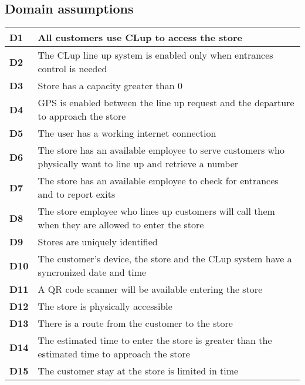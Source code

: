 \subsection{Domain assumptions}

    \begin{center}
        {\renewcommand{\arraystretch}{2}%
        \begin{longtable}{L{2cm}L{12cm}}
            \hline
            \textbf{D1} & All customers use CLup to access the store \\
            \hline
            \textbf{D2} & The CLup line up system is enabled only when entrances control is needed \\
            \hline
            \textbf{D3} & Store has a capacity greater than 0 \\
            \hline
            \textbf{D4} & GPS is enabled between the line up request and the departure to approach the store \\
            \hline
            \textbf{D5} & The user has a working internet connection \\
            \hline
            \textbf{D6} & The store has an available employee to serve customers who physically want to line up and retrieve a number \\
            \hline
            \textbf{D7} & The store has an available employee to check for entrances and to report exits \\
            \hline
            \textbf{D8} & The store employee who lines up customers will call them when they are allowed to enter the store \\
            \hline
            \textbf{D9} & Stores are uniquely identified \\
            \hline
            \textbf{D10} & The customer's device, the store and the CLup system have a syncronized date and time \\
            \hline
            \textbf{D11} & A QR code scanner will be available entering the store \\
            \hline
            \textbf{D12} & The store is physically accessible \\
            \hline
            \textbf{D13} & There is a route from the customer to the store \\
            \hline
            \textbf{D14} & The estimated time to enter the store is greater than the estimated time to approach the store \\
            \hline
            \textbf{D15} & The customer stay at the store is limited in time \\

\end{longtable}}
\end{center}
